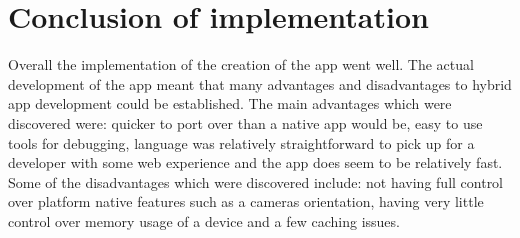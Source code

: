 \section{Conclusion of implementation}
Overall the implementation of the creation of the app went well. The actual development of the app meant that many advantages and disadvantages to hybrid app development could be established. The main advantages which were discovered were: quicker to port over than a native app would be, easy to use tools for debugging, language was relatively straightforward to pick up for a developer with some web experience and the app does seem to be relatively fast. Some of the disadvantages which were discovered include: not having full control over platform native features such as a cameras orientation, having very little control over memory usage of a device and a few caching issues.

